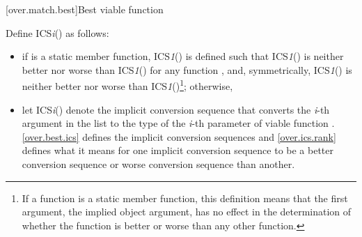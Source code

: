 [over.match.best]{Best viable function}%

\pnum
{}%
Define ICS\textit{i}() as follows:

\begin{itemize}
\item
if
is a static member function, ICS\textit{1}() is defined such that
ICS\textit{1}() is neither better nor worse than ICS\textit{1}()
for any function
,
and, symmetrically, ICS\textit{1}() is neither better nor worse than
ICS\textit{1}()\footnote{If a function is a static member function, this
definition means that the first argument, the implied object argument,
has no effect in the determination of whether the function is better
or worse than any other function.};
otherwise,
\item
let ICS\textit{i}() denote the implicit conversion sequence that converts
the \textit{i}-th argument in the list to the type of the
\textit{i}-th
parameter
of viable function
.
\ref{over.best.ics} defines the implicit conversion sequences and \ref{over.ics.rank}
defines what it means for one implicit conversion sequence to be
a better conversion sequence or worse conversion sequence than
another.
\end{itemize}

